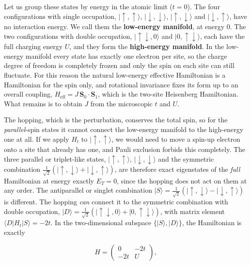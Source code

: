 Let us group these states by energy in the atomic limit ($t=0$). The four configurations with single
occupation, $|\!\uparrow,\uparrow\rangle$, $|\!\downarrow,\downarrow\rangle$, $|\!\uparrow,\downarrow\rangle$
and $|\!\downarrow,\uparrow\rangle$, have no interaction energy. We call them the \textbf{low-energy
manifold}, at energy $0$. The two configurations with double occupation,
$|\!\uparrow\downarrow,0\rangle$ and $|0,\uparrow\downarrow\rangle$, each have the full charging
energy $U$, and they form the \textbf{high-energy manifold}. In the low-energy manifold every state has
exactly one electron per site, so the charge degree of freedom is completely frozen and only the spin
on each site can still fluctuate. For this reason the natural low-energy effective Hamiltonian is a
Hamiltonian for the spin only, and rotational invariance fixes its form up to an overall coupling,
$H_\text{eff} = J\,
\mathbf S_0\cdot\mathbf S_1$, which is the two-site Heisenberg Hamiltonian. What
remains is to obtain $J$ from the microscopic $t$ and $U$.

The hopping, which is the perturbation, conserves the total spin, so for the \emph{parallel}-spin
states it cannot connect the low-energy manifold to the high-energy one at all. If we apply $H_t$ to
$|\!\uparrow,\uparrow\rangle$, we would need to move a spin-up electron onto a site that already has
one, and Pauli exclusion forbids this completely. The three parallel or triplet-like states,
$|\!\uparrow,\uparrow\rangle$, $|\!\downarrow,\downarrow\rangle$ and the symmetric combination
$\tfrac{1}{\sqrt2}(|\!\uparrow,\downarrow\rangle+|\!\downarrow,\uparrow\rangle)$, are therefore exact
eigenstates of the \emph{full} Hamiltonian at energy exactly $E_T=0$, since the hopping does not act
on them at any order. The antiparallel or singlet combination
$|S\rangle=\tfrac{1}{\sqrt2}(|\!\uparrow,\downarrow\rangle-|\!\downarrow,\uparrow\rangle)$ is
different. The hopping \emph{can} connect it to the symmetric combination with double occupation,
$|D\rangle=\tfrac{1}{\sqrt2}(|\!\uparrow\downarrow,0\rangle+|0,\uparrow\downarrow\rangle)$, with
matrix element $\langle D|H_t|S\rangle = -2t$. In the two-dimensional subspace
$\{|S\rangle,|D\rangle\}$, the Hamiltonian is exactly

\begin{equation*}
H = \begin{pmatrix} 0 & -2t \\ -2t & U\end{pmatrix},
\end{equation*}

